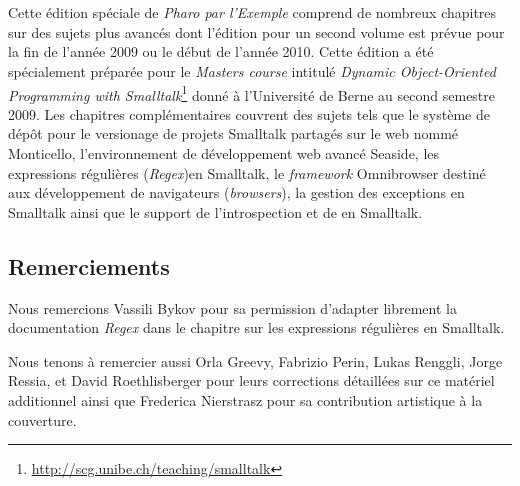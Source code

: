 \documentclass[a4paper,10pt,twoside]{book}
\begin{document}
	\sloppy
	\frontmatter
\fi
\chapter{}
\newcommand{\web}{web\xspace}
\newcommand{\framework}{\emph{framework}\xspace}

Cette édition spéciale de \emph{Pharo par l'Exemple} comprend de
nombreux chapitres sur des sujets plus avancés
dont l'édition pour un second volume est prévue pour la fin de l'année
2009 ou le début de l'année 2010.
Cette édition a été spécialement préparée pour le 
\emph{Masters course} intitulé \emph{Dynamic Object-Oriented
  Programming with
  Smalltalk}\footnote{\url{http://scg.unibe.ch/teaching/smalltalk}}
donné à l'Université de Berne au second semestre 2009.
Les chapitres complémentaires couvrent des sujets tels que le système
de dépôt pour le versionage de projets Smalltalk partagés sur le \web
nommé Monticello,
l'environnement de développement \web avancé Seaside,
les expressions régulières (\emph{Regex})en Smalltalk,
le \framework Omnibrowser destiné aux développement de navigateurs
(\emph{browsers}),
la gestion des exceptions en Smalltalk ainsi que le support de
l'introspection et de  en Smalltalk.

\section*{Remerciements}

Nous remercions Vassili Bykov pour sa permission d'adapter librement
la documentation \emph{Regex} dans le chapitre sur les expressions
régulières en Smalltalk.

Nous tenons à remercier aussi
Orla Greevy,
Fabrizio Perin,
Lukas Renggli,
Jorge Ressia,
et
David Roethlisberger
pour leurs corrections détaillées sur ce matériel additionnel
ainsi que Frederica Nierstrasz pour sa contribution 
artistique à la couverture.




\ifx\wholebook\relax\else
   
   
\end{document}
